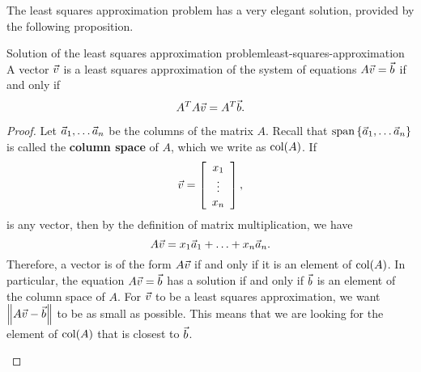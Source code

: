 \documentclass{ximera}
\begin{document}
The least squares approximation problem has a very elegant solution,
provided by the following proposition.

\begin{proposition}{Solution of the least squares approximation problem}{least-squares-approximation}
  A vector $\vect{v}$ is a least squares approximation of the system
  of equations $A\vect{v}=\vect{b}$ if and only if
  \begin{equation*}
    A^TA\vect{v} = A^T\vect{b}.
  \end{equation*}
\end{proposition}

\begin{proof}
  Let $\vect{a}_1,\ldots\vect{a}_n$ be the columns of the matrix
  $A$. Recall that $\sspan\set{\vect{a}_1,\ldots\vect{a}_n}$ is called
  the \textbf{column space}%
   of $A$, which we write as $\col(A)$.  If
  \begin{equation*}
    \vect{v} = \startmat{c} x_1 \\ \vdots \\ x_n \stopmat,
  \end{equation*}
  is any vector, then by the definition of matrix multiplication, we
  have
  \begin{equation*}
    A\vect{v} = x_1\vect{a}_1 + \ldots + x_n\vect{a}_n.
  \end{equation*}
  Therefore, a vector is of the form $A\vect{v}$ if and only if it is
  an element of $\col(A)$. In particular, the equation
  $A\vect{v}=\vect{b}$ has a solution if and only if $\vect{b}$ is an
  element of the column space of $A$. For $\vect{v}$ to be a least
  squares approximation, we want $\norm{A\vect{v}-\vect{b}}$ to be as
  small as possible. This means that we are looking for the element of
  $\col(A)$ that is closest to $\vect{b}$.
  \begin{center}
\end{center}
\end{proof}
\end{document}
